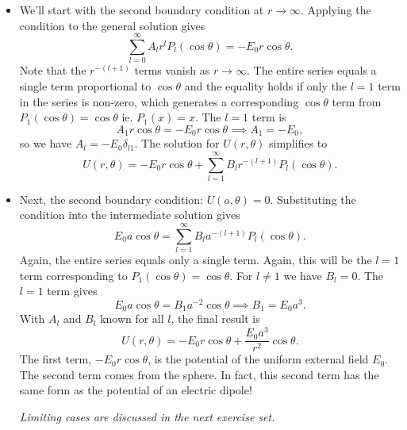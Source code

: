 \documentclass[11pt, a4paper]{article}
\begin{document}
\begin{itemize}
	\item We'll start with the second boundary condition at $ r \to \infty $. Applying the condition to the general solution gives
	\begin{equation*}
		\sum_{l = 0}^{\infty} A_{l}r^{l} P_{l}(\cos \theta) = -E_{0}r \cos \theta.
	\end{equation*}
	Note that the $ r^{-(l+1)} $ terms vanish as $ r \to \infty $. The entire series equals a single term proportional to $ \cos \theta $ and the equality holds if only the $ l = 1 $ term in the series is non-zero, which generates a corresponding $ \cos \theta $ term from $ P_{1}(\cos \theta) = \cos \theta $ ie. $ P_{1}(x) = x $. The $ l = 1 $ term is
	\begin{equation*}
		A_{1}r \cos \theta = -E_{0}r \cos \theta \implies A_{1} = - E_{0},
	\end{equation*}
	so we have $ A_{l} = -E_{0}\delta_{l1} $. The solution for $ U(r, \theta) $ simplifies to
	\begin{equation*}
		U(r, \theta) = -E_{0}r \cos \theta + \sum_{l=1}^{\infty} B_{l}r^{-(l+1)}P_{l}(\cos \theta).
	\end{equation*}
	
	\item Next, the second boundary condition: $ U(a, \theta) = 0 $. Substituting the condition into the intermediate solution gives
	\begin{equation*}
		E_{0}a\cos \theta = \sum_{l=1}^{\infty} B_{l}a^{-(l+1)}P_{l}(\cos \theta).
	\end{equation*}
	Again, the entire series equals only a single term. Again, this will be the $ l = 1 $ term corresponding to $ P_{1}(\cos \theta) = \cos \theta $. For $ l \neq 1 $ we have $ B_{l} = 0 $. The $ l = 1 $ term gives
	\begin{equation*}
		E_{0}a\cos \theta = B_{1}a^{-2}\cos \theta \implies B_{1} = E_{0}a^{3}.
	\end{equation*}
	With $ A_{l} $ and $ B_{l} $ known for all $ l $, the final result is
	\begin{equation*}
		U(r, \theta) = - E_{0} r \cos \theta + \frac{E_{0}a^{3}}{r^{2}}\cos \theta.
	\end{equation*}
	The first term, $ - E_{0} r \cos \theta $, is the potential of the uniform external field $ E_{0} $. The second term comes from the sphere. In fact, this second term has the same form as the potential of an electric dipole!
	
	\textit{Limiting cases are discussed in the next exercise set.}
\end{itemize}
\end{document}
